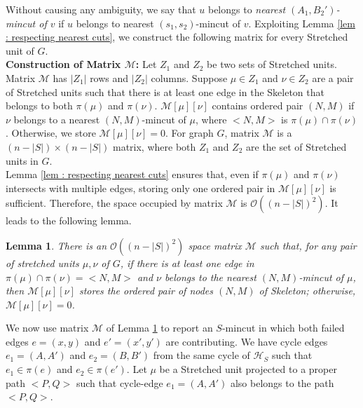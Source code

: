 \documentclass[letterpaper,11pt]{article}
\newtheorem{lemma}{Lemma}[]
\begin{document}
Without causing any ambiguity, we say that $u$ belongs to \textit{nearest $(A_1,B_2')$-mincut of $v$} if $u$ belongs to nearest $(s_1,s_2)$-mincut of $v$. Exploiting Lemma \ref{lem : respecting nearest cuts}, we construct the following matrix for every Stretched unit of $G$.\\

\noindent
\textbf{Construction of Matrix ${\mathcal M}$:} Let $Z_1$ and $Z_2$ be two sets of Stretched units. Matrix ${\mathcal M}$ has $|Z_1|$ rows and $|Z_2|$ columns. Suppose $\mu\in Z_1$ and $\nu\in Z_2$ are a pair of Stretched units such that there is at least one edge in the Skeleton that belongs to both $\pi(\mu)$ and $\pi(\nu)$. ${\mathcal M}[\mu][\nu]$ contains ordered pair $(N,M)$ if $\nu$ belongs to a nearest $(N,M)$-mincut of $\mu$, where $<N,M>$ is $\pi(\mu)\cap \pi(\nu)$. 
Otherwise, we store ${\mathcal M}[\mu][\nu]=0$. For graph $G$, matrix ${\mathcal M}$ is a $(n-|S|)\times (n-|S|)$ matrix, where both $Z_1$ and $Z_2$ are the set of Stretched units in $G$. \\



\noindent
Lemma \ref{lem : respecting nearest cuts} ensures that, even if $\pi(\mu)$ and $\pi(\nu)$ intersects with multiple edges, storing only one ordered pair in ${\mathcal M}[\mu][\nu]$ is sufficient.  Therefore, the space occupied by matrix ${\mathcal M}$ is ${\mathcal O}((n-|S|)^2)$. It leads to the following lemma.
\begin{lemma} \label{lem : matrix M}
    There is an ${\mathcal O}((n-|S|)^2)$ space matrix ${\mathcal M}$ such that, for any pair of stretched units $\mu,\nu$ of $G$, if there is at least one edge in $\pi(\mu) \cap \pi(\nu)=<N,M>$ and $\nu$ belongs to the nearest $(N,M)$-mincut of $\mu$, then ${\mathcal M}[\mu][\nu]$ stores the ordered pair of nodes $(N,M)$ of Skeleton; otherwise, ${\mathcal M}[\mu][\nu]=0$. 
\end{lemma}
We now use matrix ${\mathcal M}$ of Lemma \ref{lem : matrix M} to report an $S$-mincut in which both failed edges $e=(x,y)$ and $e'=(x',y')$ are contributing. We have cycle edges $e_1=(A,A')$ and $e_2=(B,B')$ from the same cycle of ${\mathcal H}_S$ such that $e_1\in \pi(e)$ and $e_2\in \pi(e')$. Let $\mu$ be a Stretched unit projected to a proper path $<P,Q>$ such that cycle-edge $e_1=(A,A')$ also belongs to the path $<P,Q>$. \\
\end{document}
